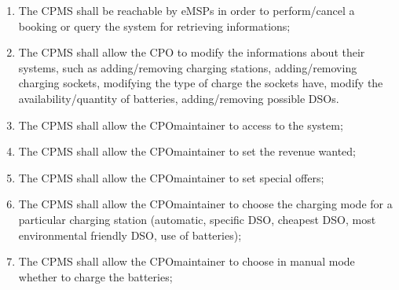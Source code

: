 \begin{enumerate}[label=\textbf{R\arabic*}]
    \item The \ac{CPMS} shall be reachable by \acp{eMSP} in order to perform/cancel a booking or query the system for retrieving informations;
    \item The \ac{CPMS} shall allow the \ac{CPO} to modify the informations about their systems, such as adding/removing charging stations, adding/removing charging sockets, modifying the type of charge the sockets have, modify the availability/quantity of batteries, adding/removing possible \acp{DSO}.
    \item The \ac{CPMS} shall allow the \ac{CPO}maintainer to access to the system;
    \item The \ac{CPMS} shall allow the \ac{CPO}maintainer to set the revenue wanted;
    \item The \ac{CPMS} shall allow the \ac{CPO}maintainer to set special offers;
    \item The \ac{CPMS} shall allow the \ac{CPO}maintainer to choose the charging mode for a particular charging station (automatic, specific \ac{DSO}, cheapest \ac{DSO}, most environmental friendly \ac{DSO}, use of batteries);
    \item The \ac{CPMS} shall allow the \ac{CPO}maintainer to choose in manual mode whether to charge the batteries;
\end{enumerate}


\clearpage
